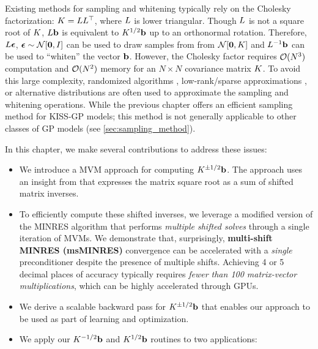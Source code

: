 Existing methods for sampling and whitening
typically rely on the Cholesky factorization: $K = L L^\top$, where $L$ is lower triangular.
Though $L$ is not a square root of $K$, $L\mathbf{b}$ is equivalent to $K^{1/2} \mathbf{b}$ up to an orthonormal rotation.
Therefore, $L\boldsymbol{\epsilon}$, $\bepsilon \sim \normaldist{\bzero}{\bI}$ can be used to draw samples from from $\normaldist{\bzero}{\bK}$ and $L^{-1} \mathbf{b}$ can be used to ``whiten'' the vector $\mathbf{b}$.
However, the Cholesky factor requires $\bigo{N^3}$ computation and $\bigo{N^2}$ memory for an $N \times N$ covariance matrix $K$.
To avoid this large complexity, randomized algorithms \cite{rahimi2008random,mutny2018efficient}, low-rank/sparse approximations \cite{hensman2017variational,wilson2020efficiently}, or alternative distributions \citep{wang2017max} are often used to approximate the sampling and whitening operations.
While the previous chapter offers an efficient sampling method for KISS-GP models; this method is not generally applicable to other classes of GP models (see \cref{sec:sampling_method}).

In this chapter, we make several contributions to address these issues:
%
\begin{itemize}
  \item We introduce a MVM approach for computing $K^{\pm 1 / 2} \mathbf{b}$.
    The approach uses an insight from \citet{hale2008computing} that expresses the matrix square root as a sum of shifted matrix inverses.

  \item To efficiently compute these shifted inverses, we leverage a modified version of the MINRES algorithm \cite{paige1975solution} that performs \emph{multiple shifted solves} through a single iteration of MVMs.
    We demonstrate that, surprisingly, {\bf multi-shift MINRES (msMINRES)} convergence can be accelerated with a \emph{single} preconditioner despite the presence of multiple shifts.
    Achieving 4 or 5 decimal places of accuracy typically requires \emph{fewer than 100 matrix-vector multiplications}, which can be highly accelerated through GPUs.

  \item We derive a scalable backward pass for $K^{\pm 1/2} \mathbf{b}$  that enables our approach to be used as part of learning and optimization.

  \item We apply our $K^{-1/2} \mathbf{b}$ and $K^{1/2} \mathbf{b}$ routines to two applications:
\end{itemize}
